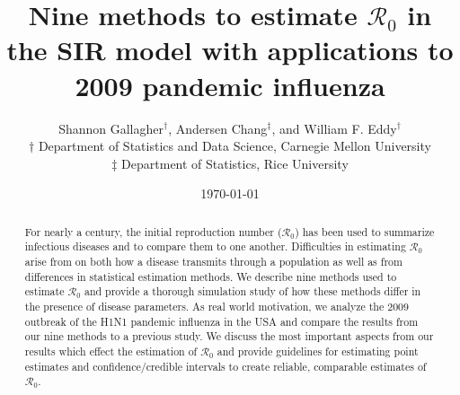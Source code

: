 \documentclass[12pt]{article}
\newcommand{\wxxsir}{nine } %
\newcommand{\Wxxsir}{Nine } %
\newcommand{\rr}{\ensuremath{\mathcal{R}_0}}
\begin{document}




\title{\Wxxsir methods to estimate $\rr$ in the SIR model with applications to 2009 pandemic influenza}
\author{ Shannon Gallagher$^{\dag}$, Andersen Chang$^{\ddag}$, and William F. Eddy$^{\dag}$ \\$\dag$ Department of Statistics and Data Science, Carnegie Mellon University\\ $\ddag$ Department of Statistics, Rice University}
\date{\today}
\maketitle

\begin{abstract}
For nearly a century, the initial reproduction number ($\rr$) has been used to summarize infectious diseases and to compare them to one another.  Difficulties in estimating $\rr$ arise from on both how a disease transmits through a population as well as from differences in statistical estimation methods.  We describe \wxxsir methods used to estimate $\rr$ and provide a thorough simulation study of how these methods differ in the presence of disease parameters.  As real world motivation, we analyze the 2009 outbreak of the H1N1 pandemic influenza in the USA and compare the results from our nine methods to a previous study.  We discuss the most important aspects from our results which effect the estimation of $\rr$ and provide guidelines for estimating point estimates and confidence/credible intervals to create reliable, comparable estimates of $\rr$.
  \end{abstract}
\end{document}
